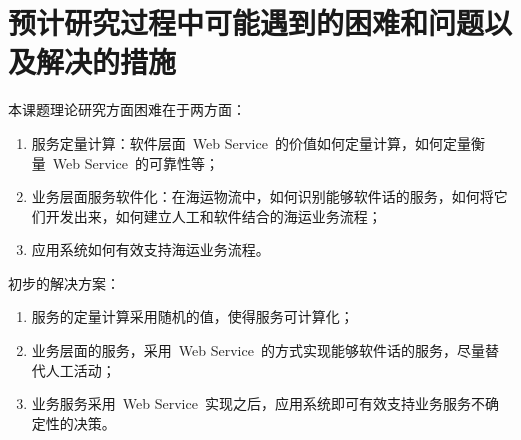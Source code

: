 \section{预计研究过程中可能遇到的困难和问题以及解决的措施}

本课题理论研究方面困难在于两方面：
\begin{enumerate}
    \item 服务定量计算：软件层面~Web Service~的价值如何定量计算，如何定量衡量~Web Service~的可靠性等；
    \item 业务层面服务软件化：在海运物流中，如何识别能够软件话的服务，如何将它们开发出来，如何建立人工和软件结合的海运业务流程；
    \item 应用系统如何有效支持海运业务流程。
\end{enumerate}

初步的解决方案：
\begin{enumerate}
    \item 服务的定量计算采用随机的值，使得服务可计算化；
    \item 业务层面的服务，采用~Web Service~的方式实现能够软件话的服务，尽量替代人工活动；
    \item 业务服务采用~Web Service~实现之后，应用系统即可有效支持业务服务不确定性的决策。
\end{enumerate}
